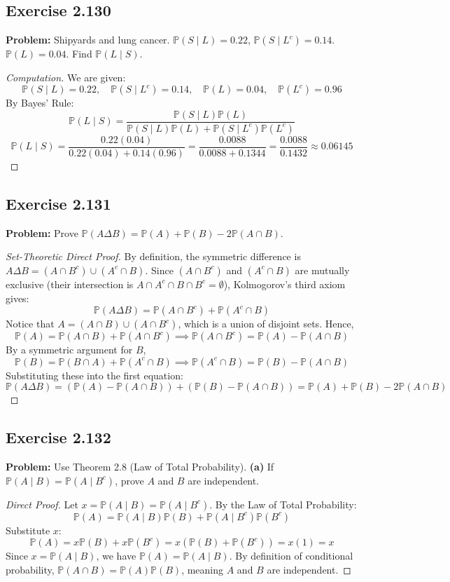 \documentclass[12pt]{article}
\theoremstyle{definition}
\theoremstyle{remark}
\newcommand{\Pbb}{\mathbb{P}}
\begin{document}
\subsection*{Exercise 2.130}
\textbf{Problem:} Shipyards and lung cancer. $\Pbb(S \mid L) = 0.22$, $\Pbb(S \mid L^c) = 0.14$. $\Pbb(L) = 0.04$. Find $\Pbb(L \mid S)$.
\begin{proof}[Computation]
We are given:
\[ \Pbb(S \mid L) = 0.22, \quad \Pbb(S \mid L^c) = 0.14, \quad \Pbb(L) = 0.04, \quad \Pbb(L^c) = 0.96 \]
By Bayes' Rule:
\[ \Pbb(L \mid S) = \frac{\Pbb(S \mid L)\Pbb(L)}{\Pbb(S \mid L)\Pbb(L) + \Pbb(S \mid L^c)\Pbb(L^c)} \]
\[ \Pbb(L \mid S) = \frac{0.22(0.04)}{0.22(0.04) + 0.14(0.96)} = \frac{0.0088}{0.0088 + 0.1344} = \frac{0.0088}{0.1432} \approx 0.06145 \]
\end{proof}

\subsection*{Exercise 2.131}
\textbf{Problem:} Prove $\Pbb(A \Delta B) = \Pbb(A) + \Pbb(B) - 2\Pbb(A \cap B)$.
\begin{proof}[Set-Theoretic Direct Proof]
By definition, the symmetric difference is $A \Delta B = (A \cap B^c) \cup (A^c \cap B)$.
Since $(A \cap B^c)$ and $(A^c \cap B)$ are mutually exclusive (their intersection is $A \cap A^c \cap B \cap B^c = \emptyset$), Kolmogorov's third axiom gives:
\[ \Pbb(A \Delta B) = \Pbb(A \cap B^c) + \Pbb(A^c \cap B) \]
Notice that $A = (A \cap B) \cup (A \cap B^c)$, which is a union of disjoint sets. Hence,
\[ \Pbb(A) = \Pbb(A \cap B) + \Pbb(A \cap B^c) \implies \Pbb(A \cap B^c) = \Pbb(A) - \Pbb(A \cap B) \]
By a symmetric argument for $B$,
\[ \Pbb(B) = \Pbb(B \cap A) + \Pbb(A^c \cap B) \implies \Pbb(A^c \cap B) = \Pbb(B) - \Pbb(A \cap B) \]
Substituting these into the first equation:
\[ \Pbb(A \Delta B) = (\Pbb(A) - \Pbb(A \cap B)) + (\Pbb(B) - \Pbb(A \cap B)) = \Pbb(A) + \Pbb(B) - 2\Pbb(A \cap B) \]
\end{proof}

\subsection*{Exercise 2.132}
\textbf{Problem:} Use Theorem 2.8 (Law of Total Probability).
\textbf{(a)} If $\Pbb(A \mid B) = \Pbb(A \mid B^c)$, prove $A$ and $B$ are independent.
\begin{proof}[Direct Proof]
Let $x = \Pbb(A \mid B) = \Pbb(A \mid B^c)$. By the Law of Total Probability:
\[ \Pbb(A) = \Pbb(A \mid B)\Pbb(B) + \Pbb(A \mid B^c)\Pbb(B^c) \]
Substitute $x$:
\[ \Pbb(A) = x\Pbb(B) + x\Pbb(B^c) = x(\Pbb(B) + \Pbb(B^c)) = x(1) = x \]
Since $x = \Pbb(A \mid B)$, we have $\Pbb(A) = \Pbb(A \mid B)$. By definition of conditional probability, $\Pbb(A \cap B) = \Pbb(A)\Pbb(B)$, meaning $A$ and $B$ are independent.
\end{proof}
\end{document}
